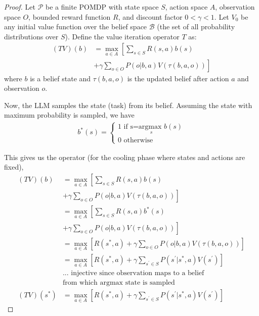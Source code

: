 \begin{proof}
Let $\mathcal{P}$ be a finite POMDP with state space $S$, action space $A$, observation space $O$, bounded reward function $R$, and discount factor $0 < \gamma < 1$.  
Let $V_0$ be any initial value function over the belief space $\mathcal{B}$ (the set of all probability distributions over $S$).  
Define the value iteration operator $T$ as:
\begin{align*}
 (TV)(b) &= \max_{a \in A} \left[ \sum_{s \in S} R(s, a) b(s) \right. \\
  & \left. + \gamma \sum_{o \in O} P(o|b, a) V(\tau(b, a, o)) \right]   
\end{align*}
where $b$ is a belief state and $\tau(b, a, o)$ is the updated belief after action $a$ and observation $o$.

Now, the LLM samples the state (task) from its belief. Assuming the state with maximum probability is sampled, we have
\begin{align*}
b^*(s) =
\begin{cases}
     1 \text{ if s=} \underset{s}{\text{argmax }} b(s) \\
     0 \text{ otherwise}
\end{cases}
\end{align*}

This gives us the operator (for the cooling phase where states and actions are fixed),
\small
\begin{align*}
    (TV)(b) &= \max_{a \in A} \left[ \sum_{s \in S} R(s, a) b(s) \right. \\
    &\left.+ \gamma \sum_{o \in O} P(o|b, a) V(\tau(b, a, o)) \right] \\
    &= \max_{a \in A} \left[ \sum_{s \in S} R(s, a) b^*(s) \right. \\
    &\left. + \gamma \sum_{o \in O} P(o|b, a) V(\tau(b, a, o)) \right] \\
    &= \max_{a \in A} \left[ R(s^*, a) + \gamma \sum_{o \in O} P(o|b, a) V(\tau(b, a, o)) \right] \\
    &= \max_{a \in A} \left[ R(s^*, a) + \gamma \sum_{s^{'} \in S} P(s^{'}|s^*, a) V(s^{'}) \right] \\
    &\text{... injective since observation maps to a belief} \\
    &\text{from which argmax state is sampled}\\ 
    (TV)(s^*) &= \max_{a \in A} \left[ R(s^*, a) + \gamma \sum_{s^{'} \in S} P(s^{'}|s^*, a) V(s^{'}) \right]
\end{align*}
\normalsize


\end{proof}
